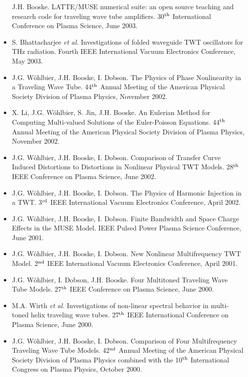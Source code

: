 \begin{itemize}
 J.H. Booske. LATTE/MUSE numerical suite: an open source teaching and
 research code for traveling wave tube amplifiers. 30$^{\rm th}$
 International Conference on Plasma Science, June 2003.
\item S. Bhattacharjee {\it et al.} Investigations of folded waveguide
  TWT oscillators for THz radiation. Fourth IEEE International Vacuum
  Electronics Conference, May 2003.
\item J.G. W\"ohlbier, J.H. Booske, I. Dobson.
  The Physics of Phase Nonlinearity in a Traveling Wave Tube.
  44$^{\rm th}$ Annual Meeting of the American Physical Society
  Division of Plasma Physics, November 2002.
\item X. Li, J.G. W\"ohlbier, S. Jin, J.H. Booske.
  An Eulerian Method for Computing Multi-valued Solutions of the
  Euler-Poisson Equations.
  44$^{\rm th}$ Annual Meeting of the American Physical Society
  Division of Plasma Physics, November 2002.
\item J.G. W\"ohlbier, J.H. Booske, I. Dobson.
  Comparison of Transfer Curve Induced Distortions to Distortions in
  Nonlinear Physical TWT Models.
  28$^{\rm th}$ IEEE Conference on Plasma Science, June 2002.
\item J.G. W\"ohlbier, J.H. Booske, I. Dobson.
  The Physics of Harmonic Injection in a TWT.
  3$^{\rm rd}$ IEEE International Vacuum Electronics Conference, April
  2002.
\item J.G. W\"ohlbier, J.H. Booske, I. Dobson.
  Finite Bandwidth and Space Charge Effects in the MUSE Model. IEEE
  Pulsed Power Plasma Science Conference, June 2001.
\item J.G. W\"ohlbier, J.H. Booske, I. Dobson.
  New Nonlinear Multifrequency TWT Model.
  2$^{\rm nd}$ IEEE International Vacuum Electronics Conference, April 2001.
\item J.G. W\"ohlbier, I. Dobson, J.H. Booske.
  Four Multitoned Traveling Wave Tube Models.
  27$^{\rm th}$ IEEE Conference on Plasma Science, June 2000.
\item M.A. Wirth {\it et al.} Investigations of non-linear spectral
  behavior in multi-toned helix traveling wave tubes. 27$^{\rm th}$
  IEEE International Conference on Plasma Science, June 2000.
\item J.G. W\"ohlbier, J.H. Booske, I. Dobson.
  Comparison of Four Multifrequency Traveling Wave Tube Models.
  42$^{\rm nd}$ Annual Meeting of the American Physical Society Division
  of Plasma Physics combined with the 10$^{\rm th}$ International Congress
  on Plasma Physics, October 2000.

\end{itemize}
